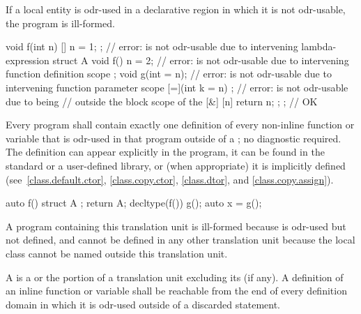 If a local entity is odr-used
in a declarative region in which it is not odr-usable,
the program is ill-formed.
\begin{example}
\begin{codeblock}
void f(int n) {
  [] { n = 1; };                // error:  is not odr-usable due to intervening lambda-expression
  struct A {
    void f() { n = 2; }         // error:  is not odr-usable due to intervening function definition scope
  };
  void g(int = n);              // error:  is not odr-usable due to intervening function parameter scope
  [=](int k = n) {};            // error:  is not odr-usable due to being
                                // outside the block scope of the 
  [&] { [n]{ return n; }; };    // OK
}
\end{codeblock}
\end{example}

\pnum
Every program shall contain exactly one definition of every non-inline
function or variable that is odr-used in that program
outside of a ; no diagnostic required.
The definition can appear explicitly in the program, it can be found in
the standard or a user-defined library, or (when appropriate) it is
implicitly defined (see~\ref{class.default.ctor}, \ref{class.copy.ctor},
\ref{class.dtor}, and \ref{class.copy.assign}).
\begin{example}
\begin{codeblock}
auto f() {
  struct A {};
  return A{};
}
decltype(f()) g();
auto x = g();
\end{codeblock}
A program containing this translation unit is ill-formed
because  is odr-used but not defined,
and cannot be defined in any other translation unit
because the local class  cannot be named outside this
translation unit.
\end{example}

\pnum
A  is
a  or
the portion of a translation unit
excluding its  (if any).
A definition of an inline function or variable shall be reachable
from the end of every definition domain
in which it is odr-used outside of a discarded statement.

